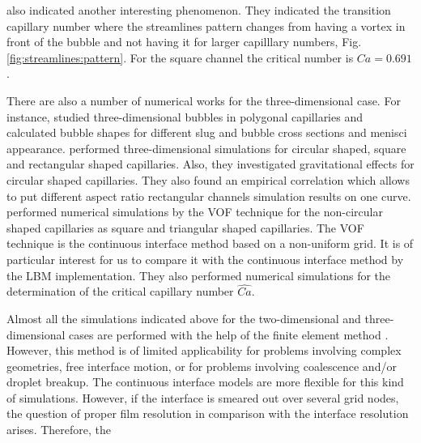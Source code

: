 \documentclass{CFD2011}
\begin{document}
\begin{description}
\citet{heil-threedim} also indicated another interesting phenomenon. They indicated the transition
capillary number where the streamlines pattern
changes from having a vortex in front of the bubble and not having it for larger capilllary
numbers,
Fig. \ref{fig:streamlines:pattern}.
For the square channel the critical number is $Ca=0.691$.   

There are also a number of numerical works for the three-dimensional case. For instance, 
\citet{wong-films,wong-pressure} studied
three-dimensional bubbles in
polygonal capillaries and calculated bubble shapes for different
slug and bubble cross sections and menisci appearance.
\citet{heil-threedim} performed three-dimensional simulations for circular shaped,
square and rectangular shaped capillaries. Also, they investigated gravitational effects for
circular shaped capillaries. They also found an empirical correlation which allows to put
different  aspect ratio rectangular channels simulation results on one
curve. \citet{wang-non-circular} performed numerical simulations by the VOF technique for the
non-circular
shaped capillaries as square and triangular shaped capillaries. The VOF technique is the continuous
interface method based on a non-uniform grid. It is of particular interest for us to compare it
with the continuous interface method by the LBM implementation. 
They also performed
numerical simulations for the determination of the critical capillary number $\widehat{Ca}$.
\end{description}
Almost all the simulations indicated above for the two-dimensional and three-dimensional cases
are performed with the help of the finite element method
\cite{ingham-plates,heil-bretherton,heil-threedim}. However, this method is of limited
applicability for
problems
involving complex geometries, free interface motion, or for problems involving coalescence and/or
droplet breakup. The continuous interface models are more flexible for this kind of simulations.
However, if the interface is smeared out over several grid nodes, the question of
proper film resolution in comparison with the interface resolution arises.  Therefore, the
\end{document}
